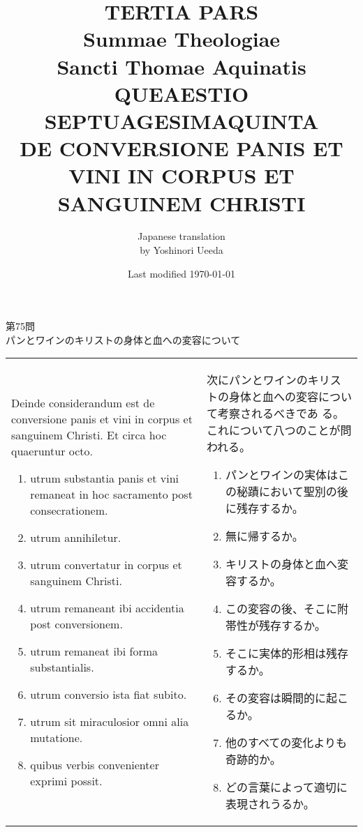 \documentclass[10pt]{jsarticle} %
\title{{\bf TERTIA PARS}\\{\HUGE Summae Theologiae}\\Sancti Thomae
Aquinatis\\{\sffamily QUEAESTIO SEPTUAGESIMAQUINTA}\\DE CONVERSIONE
PANIS ET VINI IN CORPUS ET SANGUINEM CHRISTI}
\author{Japanese translation\\by Yoshinori {\sc Ueeda}}
\date{Last modified \today}
\begin{document}
\maketitle
\pagestyle{fancy}

\begin{center}
{\Large 第75問\\パンとワインのキリストの身体と血への変容について}
\end{center}

\begin{longtable}{p{21em}p{21em}}
Deinde considerandum est de conversione panis et vini in corpus et
 sanguinem Christi. Et circa hoc quaeruntur octo. 

\begin{enumerate}
 \item utrum substantia panis et vini remaneat in hoc sacramento post
 consecrationem.
 \item utrum annihiletur.
 \item utrum convertatur in corpus et sanguinem Christi.
 \item utrum remaneant ibi accidentia post conversionem.
 \item utrum remaneat ibi forma substantialis.
 \item utrum conversio ista fiat subito.
 \item utrum sit miraculosior omni alia mutatione.
 \item quibus verbis convenienter exprimi possit.
\end{enumerate}

&

次にパンとワインのキリストの身体と血への変容について考察されるべきであ
 る。これについて八つのことが問われる。

\begin{enumerate}
 \item パンとワインの実体はこの秘蹟において聖別の後に残存するか。
 \item 無に帰するか。
 \item キリストの身体と血へ変容するか。
 \item この変容の後、そこに附帯性が残存するか。
 \item そこに実体的形相は残存するか。
 \item その変容は瞬間的に起こるか。
 \item 他のすべての変化よりも奇跡的か。
 \item どの言葉によって適切に表現されうるか。
\end{enumerate}


\\



\end{longtable}
\end{document}
